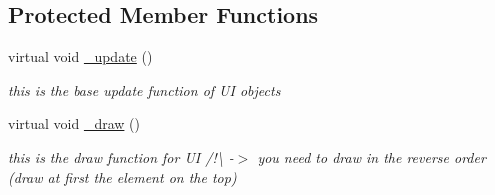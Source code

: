 \subsection*{Protected Member Functions}
\begin{DoxyCompactItemize}
\item 
\mbox{\label{class_scrollbar_u_i_a75d909bc72204564034629439f6c0489}} 
virtual void \hyperlink{class_scrollbar_u_i_a75d909bc72204564034629439f6c0489}{\+\_\+update} ()
\begin{DoxyCompactList}\small\item\em this is the base update function of UI objects \end{DoxyCompactList}\item 
\mbox{\label{class_scrollbar_u_i_adac2d8cc8f17d8db4170abe7ff9d3dad}} 
virtual void \hyperlink{class_scrollbar_u_i_adac2d8cc8f17d8db4170abe7ff9d3dad}{\+\_\+draw} ()
\begin{DoxyCompactList}\small\item\em this is the draw function for UI /!\textbackslash{} -\/$>$ you need to draw in the reverse order (draw at first the element on the top) \end{DoxyCompactList}\end{DoxyCompactItemize}
